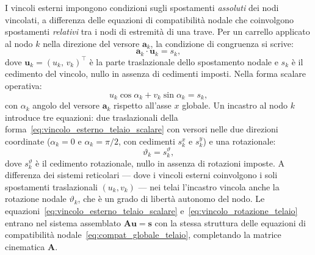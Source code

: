 I vincoli esterni impongono condizioni sugli spostamenti
\emph{assoluti} dei nodi vincolati, a differenza delle
equazioni di compatibilità nodale che coinvolgono
spostamenti \emph{relativi} tra i nodi di estremità
di una trave. Per un carrello applicato al nodo $k$
nella direzione del versore $\mathbf{a}_k$, la
condizione di congruenza si scrive:
\begin{equation}\label{eq:vincolo_esterno_telaio}
	\mathbf{a}_k \cdot \mathbf{u}_k = s_k,
\end{equation}
dove $\mathbf{u}_k = (u_k,\, v_k)^\top$ è la parte
traslazionale dello spostamento nodale e $s_k$ è
il cedimento del vincolo, nullo in assenza di
cedimenti imposti. Nella forma scalare operativa:
\begin{equation}\label{eq:vincolo_esterno_telaio_scalare}
	u_k\cos\alpha_k + v_k\sin\alpha_k = s_k,
\end{equation}
con $\alpha_k$ angolo del versore $\mathbf{a}_k$
rispetto all'asse $x$ globale.
Un incastro al nodo $k$ introduce tre equazioni:
due traslazionali della
forma~\eqref{eq:vincolo_esterno_telaio_scalare}
con versori nelle due direzioni coordinate
($\alpha_k = 0$ e $\alpha_k = \pi/2$, con cedimenti
$s_k^x$ e $s_k^y$) e una rotazionale:
\begin{equation}\label{eq:vincolo_rotazione_telaio}
	\vartheta_k = s_k^\vartheta,
\end{equation}
dove $s_k^\vartheta$ è il cedimento rotazionale,
nullo in assenza di rotazioni imposte.
A differenza dei sistemi reticolari --- dove i
vincoli esterni coinvolgono i soli spostamenti
traslazionali $(u_k, v_k)$ --- nei telai l'incastro
vincola anche la rotazione nodale $\vartheta_k$,
che è un grado di libertà autonomo del nodo.
Le equazioni~\eqref{eq:vincolo_esterno_telaio_scalare}
e~\eqref{eq:vincolo_rotazione_telaio} entrano nel
sistema assemblato $\bm{A}\bm{u} = \bm{s}$ con
la stessa struttura delle equazioni di compatibilità
nodale~\eqref{eq:compat_globale_telaio}, completando
la matrice cinematica $\bm{A}$.


